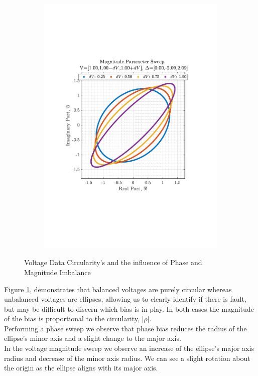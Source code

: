 \documentclass[12pt]{article}
\numberwithin{equation}{section}
\begin{document}
\begin{figure}[H]
\begin{subfigure}{0.45\textwidth}
					\includegraphics[trim={2.2cm 6.8cm 3.00cm  6.2cm}, clip, width=\textwidth]{../MATLAB/figures/q3_1c_fig04.pdf} 
					\captionsetup{justification=centering}
				\end{subfigure}
					
				\captionsetup{justification=centering}
				\caption{Voltage Data Circularity's and the influence of Phase and Magnitude Imbalance}
				\label{fig: 3-1c}
			\end{figure}
		
			Figure \ref{fig: 3-1c}, demonstrates that balanced voltages are purely circular whereas unbalanced voltages are ellipses, allowing us to clearly identify if there is fault, but may be difficult to discern which bias is in play. In both cases the magnitude of the bias is proportional to the circularity, $|\rho|$.  \\
			Performing a phase sweep we observe that phase bias reduces the radius of the ellipse's minor axis and a slight change to the major axis. \\
			In the voltage magnitude sweep we observe an increase of the ellipse's major axis radius and decrease of the minor axis radius. We can see a slight rotation about the origin as the ellipse aligns with its major axis.
			
\end{document}

